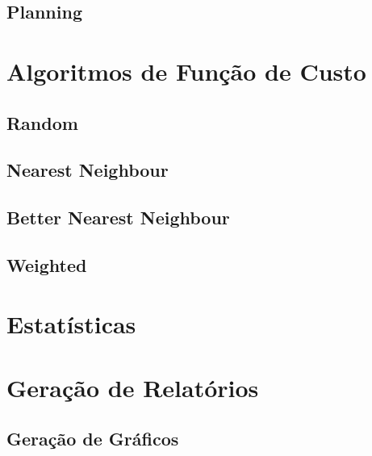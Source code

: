 \subsection{\label{model:schedulers:planning}Planning}
\lipsum[5]

\section{\label{model:costfunctions}Algoritmos de Função de Custo}
\lipsum[5]

\subsection{\label{model:costfunctions:random}Random}
\lipsum[5]

\subsection{\label{model:costfunctions:nn}Nearest Neighbour}
\lipsum[5]

\subsection{\label{model:costfunctions:bnn}Better Nearest Neighbour}
\lipsum[5]

\subsection{\label{model:costfunctions:weighted}Weighted}
\lipsum[5]

\section{\label{model:statistics}Estatísticas}
\lipsum[4]

\section{\label{model:report}Geração de Relatórios}
\lipsum[5]

\subsection{\label{model:report:charts}Geração de Gráficos}
\lipsum[5]


